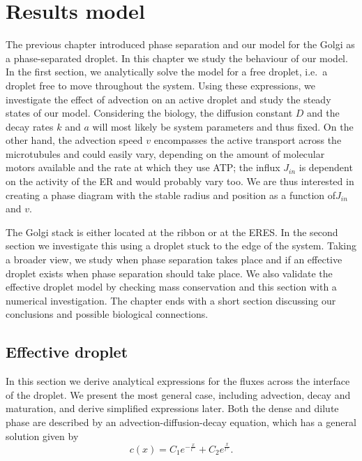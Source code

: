 \documentclass{Dissertate}
\begin{document}
\hypertarget{results-model}{%
\chapter{Results model}\label{results-model}}

The previous chapter introduced phase separation and our model for the
Golgi as a phase-separated droplet. In this chapter we study the
behaviour of our model. In the first section, we analytically solve the
model for a free droplet, i.e.~a droplet free to move throughout the
system. Using these expressions, we investigate the effect of advection
on an active droplet and study the steady states of our model.
Considering the biology, the diffusion constant \(D\) and the decay
rates \(k\) and \(a\) will most likely be system parameters and thus
fixed. On the other hand, the advection speed \(v\) encompasses the
active transport across the microtubules and could easily vary,
depending on the amount of molecular motors available and the rate at
which they use ATP; the influx \(J_{in}\) is dependent on the activity
of the ER and would probably vary too. We are thus interested in
creating a phase diagram with the stable radius and position as a
function of\(J_{in}\) and \(v\).

The Golgi stack is either located at the ribbon or at the ERES. In the
second section we investigate this using a droplet stuck to the edge of
the system. Taking a broader view, we study when phase separation takes
place and if an effective droplet exists when phase separation should
take place. We also validate the effective droplet model by checking
mass conservation and this section with a numerical investigation. The
chapter ends with a short section discussing our conclusions and
possible biological connections.

\hypertarget{effective-droplet-1}{%
\section{Effective droplet}\label{effective-droplet-1}}

In this section we derive analytical expressions for the fluxes across
the interface of the droplet. We present the most general case,
including advection, decay and maturation, and derive simplified
expressions later. Both the dense and dilute phase are described by an
advection-diffusion-decay equation, which has a general solution given
by \begin{equation}
c(x) = C_1e^{-\frac{x}{l^-}}+C_2e^{\frac{x}{l^+}}.
\label{eq:cgeneral}\end{equation}
\end{document}
